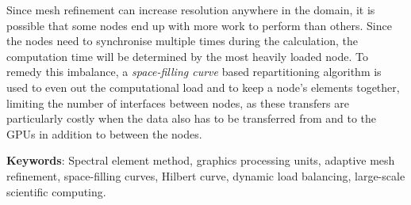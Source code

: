 Since mesh refinement can increase resolution anywhere in the domain, it is possible that some nodes
end up with more work to perform than others. Since the nodes need to synchronise multiple times 
during the calculation, the computation time will be determined by the most heavily loaded node. To 
remedy this imbalance, a \textit{space-filling curve} based repartitioning algorithm is used to even
out the computational load and to keep a node's elements together, limiting the number of interfaces
between nodes, as these transfers are particularly costly when the data also has to be  transferred
from and to the GPUs in addition to between the nodes.


\textbf{Keywords}: Spectral element method, graphics processing units, adaptive mesh refinement, space-filling curves, Hilbert curve, dynamic load balancing, large-scale scientific computing.

 